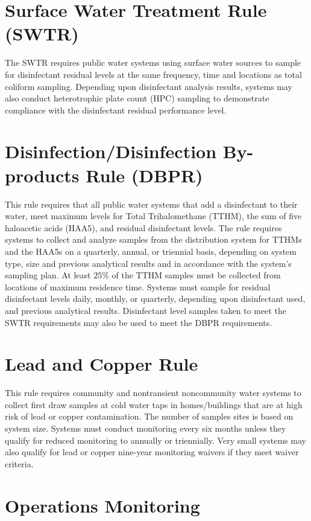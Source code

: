 \documentclass[10pt]{article}
\begin{document}
\section{Surface Water Treatment Rule (SWTR)}
The SWTR requires public water systems using surface water sources to sample for disinfectant residual levels at the same frequency, time and locations as total coliform sampling. Depending upon disinfectant analysis results, systems may also conduct heterotrophic plate count (HPC) sampling to demonstrate compliance with the disinfectant residual performance level.

\section{Disinfection/Disinfection By-products Rule (DBPR)}
This rule requires that all public water systems that add a disinfectant to their water, meet maximum levels for Total Trihalomethane (TTHM), the sum of five haloacetic acids (HAA5), and residual disinfectant levels. The rule requires systems to collect and analyze samples from the distribution system for TTHMs and the HAA5s on a quarterly, annual, or triennial basis, depending on system type, size and previous analytical results and in accordance with the system's sampling plan. At least $25 \%$ of the TTHM samples must be collected from locations of maximum residence time. Systems must sample for residual disinfectant levels daily, monthly, or quarterly, depending upon disinfectant used, and previous analytical results. Disinfectant level samples taken to meet the SWTR requirements may also be used to meet the DBPR requirements.

\section{Lead and Copper Rule}
This rule requires community and nontransient noncommunity water systems to collect first draw samples at cold water taps in homes/buildings that are at high risk of lead or copper contamination. The number of samples sites is based on system size. Systems must conduct monitoring every six months unless they qualify for reduced monitoring to annually or triennially. Very small systems may also qualify for lead or copper nine-year monitoring waivers if they meet waiver criteria.

\section{Operations Monitoring}
\end{document}
